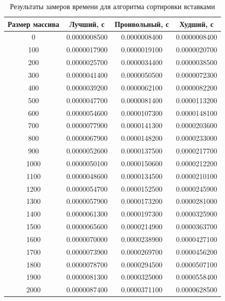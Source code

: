 \documentclass[a4paper,14pt]{report}
\begin{document}
\begin{table}[!h]
	\caption{Результаты замеров времени для алгоритма сортировки вставками}
		\begin{tabular}{| c | c | c | c |}
	 	\hline
		Размер массива & Лучший, с & Проивольный, с & Худший, с \\ [0.5ex]
		\hline
		0 & 0.0000008500 & 0.0000008400 & 0.0000008400 \\
\hline
100 & 0.0000017900 & 0.0000019100 & 0.0000020700 \\
\hline
200 & 0.0000025700 & 0.0000034400 & 0.0000038500 \\
\hline
300 & 0.0000041400 & 0.0000050500 & 0.0000072300 \\
\hline
400 & 0.0000039200 & 0.0000062100 & 0.0000082200 \\
\hline
500 & 0.0000047700 & 0.0000081400 & 0.0000113200 \\
\hline
600 & 0.0000054600 & 0.0000107300 & 0.0000148100 \\
\hline
700 & 0.0000077900 & 0.0000141300 & 0.0000203600 \\
\hline
800 & 0.0000067900 & 0.0000148200 & 0.0000233000 \\
\hline
900 & 0.0000052600 & 0.0000137500 & 0.0000217700 \\
\hline
1000 & 0.0000050100 & 0.0000150600 & 0.0000212200 \\
\hline
1100 & 0.0000048600 & 0.0000134500 & 0.0000210100 \\
\hline
1200 & 0.0000054700 & 0.0000152500 & 0.0000245900 \\
\hline
1300 & 0.0000057900 & 0.0000173200 & 0.0000281000 \\
\hline
1400 & 0.0000061300 & 0.0000197300 & 0.0000325900 \\
\hline
1500 & 0.0000065600 & 0.0000214900 & 0.0000363700 \\
\hline
1600 & 0.0000070000 & 0.0000238900 & 0.0000427100 \\
\hline
1700 & 0.0000073900 & 0.0000269700 & 0.0000456200 \\
\hline
1800 & 0.0000078700 & 0.0000294500 & 0.0000507100 \\
\hline
1900 & 0.0000081300 & 0.0000325000 & 0.0000558400 \\
\hline
2000 & 0.0000087400 & 0.0000371100 & 0.0000628500 \\
\hline
		\end{tabular}
\end{table}
\end{document}
